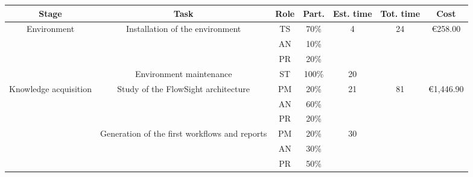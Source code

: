 \begin{table}[p]
\begin{center}
\scalebox{0.6}
{
\begin{tabular}{|c|l|c|c|l|l|l|}
\hline
\textbf{Stage} & \multicolumn{1}{c|}{\textbf{Task}} & \textbf{Role} & \textbf{Part.} & \multicolumn{1}{c|}{\textbf{Est. time}} & \multicolumn{1}{c|}{\textbf{Tot. time}} & \multicolumn{1}{c|}{\textbf{Cost}} \\ \hline
\multicolumn{ 1}{|c|}{Environment} & \multicolumn{ 1}{c|}{Installation of the environment} & TS & 70\% & \multicolumn{ 1}{c|}{4} & \multicolumn{ 1}{c|}{24} & \multicolumn{ 1}{c|}{\textgreek{\euro}258.00} \\ \cline{ 3- 4}
\multicolumn{ 1}{|c|}{} & \multicolumn{ 1}{l|}{} & AN & 10\% & \multicolumn{ 1}{l|}{} & \multicolumn{ 1}{l|}{} & \multicolumn{ 1}{l|}{} \\ \cline{ 3- 4}
\multicolumn{ 1}{|c|}{} & \multicolumn{ 1}{l|}{} & PR & 20\% & \multicolumn{ 1}{l|}{} & \multicolumn{ 1}{l|}{} & \multicolumn{ 1}{l|}{} \\ \cline{ 2- 5}
\multicolumn{ 1}{|l|}{} & \multicolumn{1}{c|}{Environment maintenance} & ST & 100\% & \multicolumn{1}{c|}{20} & \multicolumn{ 1}{l|}{} & \multicolumn{ 1}{l|}{} \\ \hline
\multicolumn{ 1}{|c|}{Knowledge acquisition} & \multicolumn{ 1}{c|}{Study of the FlowSight architecture} & PM & 20\% & \multicolumn{ 1}{c|}{21} & \multicolumn{ 1}{c|}{81} & \multicolumn{ 1}{c|}{\textgreek{\euro}1,446.90} \\ \cline{ 3- 4}
\multicolumn{ 1}{|c|}{} & \multicolumn{ 1}{l|}{} & AN & 60\% & \multicolumn{ 1}{l|}{} & \multicolumn{ 1}{l|}{} & \multicolumn{ 1}{l|}{} \\ \cline{ 3- 4}
\multicolumn{ 1}{|c|}{} & \multicolumn{ 1}{l|}{} & PR & 20\% & \multicolumn{ 1}{l|}{} & \multicolumn{ 1}{l|}{} & \multicolumn{ 1}{l|}{} \\ \cline{ 2- 5}
\multicolumn{ 1}{|c|}{} & \multicolumn{ 1}{c|}{Generation of the first workflows and reports} & PM & 20\% & \multicolumn{ 1}{c|}{30} & \multicolumn{ 1}{l|}{} & \multicolumn{ 1}{l|}{} \\ \cline{ 3- 4}
\multicolumn{ 1}{|c|}{} & \multicolumn{ 1}{l|}{} & AN & 30\% & \multicolumn{ 1}{l|}{} & \multicolumn{ 1}{l|}{} & \multicolumn{ 1}{l|}{} \\ \cline{ 3- 4}
\multicolumn{ 1}{|c|}{} & \multicolumn{ 1}{l|}{} & PR & 50\% & \multicolumn{ 1}{l|}{} & \multicolumn{ 1}{l|}{} & \multicolumn{ 1}{l|}{} \\ \cline{ 2- 5}

\end{tabular}}
\end{center}
\end{table}
